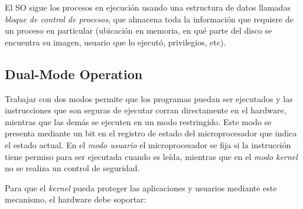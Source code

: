 \documentclass[a4paper,10pt,spanish]{article}
\begin{document}
El SO sigue los procesos en ejecución usando una estructura de datos llamadas \textit{bloque de control de procesos}, que almacena toda la información que requiere de un proceso en particular (ubicación en memoria, en qué parte del disco se encuentra su imagen, usuario que lo ejecutó, privilegios, etc). \\

\subsection{Dual-Mode Operation}

Trabajar con dos modos permite que los programas puedan ser ejecutados y las instrucciones que son seguras de ejecutar corran directamente en el hardware, mientras que las demás se ejecuten en un modo restringido. Este modo se presenta mediante un bit en el registro de estado del microprocesador que indica el estado actual. En el \textit{modo usuario} el microprocesador se fija si la instrucción tiene permiso para ser ejecutada cuando es leída, mientras que en el \textit{modo kernel} no se realiza un control de seguridad.

Para que el \textit{kernel} pueda proteger las aplicaciones y usuarios mediante este mecanismo, el hardware debe soportar:
\end{document}
